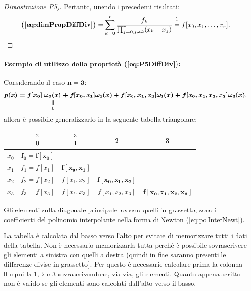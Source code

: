 \begin{proof}[Dimostrazione P5)]
    Pertanto, unendo i precedenti risultati:
    \begin{equation*}
        \textbf{(\ref{eq:dimPropDiffDiv})}=\sum_{k=0}^r\frac{f_k}{\prod_{j=0,j\neq k}^r (x_k-x_j)}\overset{\footnotemark}{=} f[x_0,x_1,\hdots,x_r].
    \end{equation*}
\end{proof}

\paragraph{Esempio di utilizzo della proprietà (\ref{eq:P5DiffDiv}):} Considerando il caso $\boldsymbol{n=3}$:
\begin{equation*}
    \boldsymbol{p(x)=f[x_0]\;\equalto{\omega_0(x)}{1}+f[x_0,x_1]\omega_1(x)+f[x_0,x_1,x_2]\omega_2(x)+f[x_0,x_1,x_2,x_3]\omega_3(x)},
\end{equation*}
allora è possibile generalizzarlo in la seguente tabella triangolare:
 
\begin{center}
\begin{tabular}{|c|c|c|c|c|} 
\hline
 & $\overset{\footnotemark}{0}$ & $\overset{\footnotemark}{1}$ & 2 & 3 \\
\hline
$x_0$ & $\boldsymbol{f_0 = f[x_0]}$ & & &  \\ 
$x_1$ & $f_1 = f[x_1]$ & $\boldsymbol{f[x_0,x_1]}$ & &  \\ 
$x_2$ & $f_2 = f[x_2]$ & $f[x_1,x_2]$ &$ \boldsymbol{f[x_0,x_1,x_2]}$ & \\
$x_3$ & $f_3 = f[x_3]$ & $f[x_2, x_3]$ & $f[x_1,x_2,x_3]$ & $\boldsymbol{f[x_0,x_1,x_2,x_3]}$ \\
\hline
\end{tabular}
\end{center}
\addtocounter{footnote}{-1}


Gli elementi sulla diagonale principale, ovvero quelli in grassetto, sono i coefficienti del polinomio interpolante nella forma di Newton (\ref{eq:polInterNewt}).

La tabella è calcolata dal basso verso l'alto per evitare di memorizzare tutti i dati della tabella. Non è necessario memorizzarla tutta perché è possibile sovrascrivere gli elementi a sinistra con quelli a destra (quindi in fine saranno presenti le differenze divise in grassetto). Per questo è necessario calcolare prima la colonna 0 e poi la 1, 2 e 3 sovrascrivendone, via via, gli elementi. Quanto appena scritto non è valido se gli elementi sono calcolati dall'alto verso il basso.

